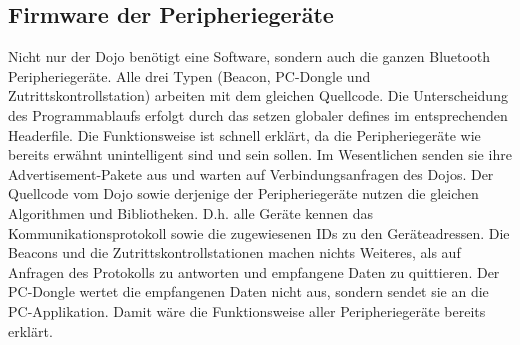 \subsection{Firmware der Peripheriegeräte}
Nicht nur der Dojo benötigt eine Software, sondern auch die ganzen Bluetooth Peripheriegeräte. Alle drei Typen (Beacon, PC-Dongle und Zutrittskontrollstation) arbeiten mit dem gleichen Quellcode. Die Unterscheidung des Programmablaufs erfolgt durch das setzen globaler defines im entsprechenden Headerfile. Die Funktionsweise ist schnell erklärt, da die Peripheriegeräte wie bereits erwähnt unintelligent sind und sein sollen. 
Im Wesentlichen senden sie ihre Advertisement-Pakete aus und warten auf Verbindungsanfragen des Dojos. Der Quellcode vom Dojo sowie derjenige der Peripheriegeräte nutzen die gleichen Algorithmen und Bibliotheken. D.h. alle Geräte kennen das Kommunikationsprotokoll sowie die zugewiesenen IDs zu den Geräteadressen. 
Die Beacons und die Zutrittskontrollstationen machen nichts Weiteres, als auf Anfragen des Protokolls zu antworten und empfangene Daten zu quittieren. Der PC-Dongle wertet die empfangenen Daten nicht aus, sondern sendet sie an die PC-Applikation. Damit wäre die Funktionsweise aller Peripheriegeräte bereits erklärt.
